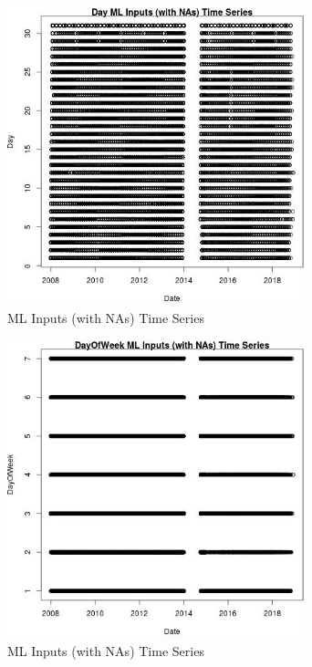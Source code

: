 \begin{figure} 
\centering  
\includegraphics[width=0.77\textwidth]{Code_Outputs/Report_ML_input_PM25_Step4_part_e_de_duplicated_aveswNAs_DayvDate.jpg} 
\caption{\label{fig:Report_ML_input_PM25_Step4_part_e_de_duplicated_aveswNAsDayvDate}ML Inputs (with NAs) Time Series} 
\end{figure} 
 

\begin{figure} 
\centering  
\includegraphics[width=0.77\textwidth]{Code_Outputs/Report_ML_input_PM25_Step4_part_e_de_duplicated_aveswNAs_DayOfWeekvDate.jpg} 
\caption{\label{fig:Report_ML_input_PM25_Step4_part_e_de_duplicated_aveswNAsDayOfWeekvDate}ML Inputs (with NAs) Time Series} 
\end{figure} 
 

